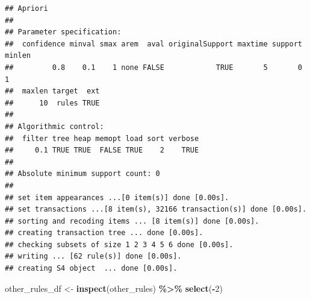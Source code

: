 \documentclass[
]{article}
\newenvironment{Shaded}{\begin{snugshade}}{\end{snugshade}}
\newcommand{\DecValTok}[1]{\textcolor[rgb]{0.00,0.00,0.81}{#1}}
\newcommand{\FunctionTok}[1]{\textcolor[rgb]{0.13,0.29,0.53}{\textbf{#1}}}
\newcommand{\NormalTok}[1]{#1}
\newcommand{\OtherTok}[1]{\textcolor[rgb]{0.56,0.35,0.01}{#1}}
\newcommand{\SpecialCharTok}[1]{\textcolor[rgb]{0.81,0.36,0.00}{\textbf{#1}}}
\begin{document}
\begin{verbatim}
## Apriori
## 
## Parameter specification:
##  confidence minval smax arem  aval originalSupport maxtime support minlen
##         0.8    0.1    1 none FALSE            TRUE       5       0      1
##  maxlen target  ext
##      10  rules TRUE
## 
## Algorithmic control:
##  filter tree heap memopt load sort verbose
##     0.1 TRUE TRUE  FALSE TRUE    2    TRUE
## 
## Absolute minimum support count: 0 
## 
## set item appearances ...[0 item(s)] done [0.00s].
## set transactions ...[8 item(s), 32166 transaction(s)] done [0.00s].
## sorting and recoding items ... [8 item(s)] done [0.00s].
## creating transaction tree ... done [0.00s].
## checking subsets of size 1 2 3 4 5 6 done [0.00s].
## writing ... [62 rule(s)] done [0.00s].
## creating S4 object  ... done [0.00s].
\end{verbatim}

\begin{Shaded}
\begin{Highlighting}[]
\NormalTok{other\_rules\_df }\OtherTok{\textless{}{-}} \FunctionTok{inspect}\NormalTok{(other\_rules) }\SpecialCharTok{\%\textgreater{}\%} \FunctionTok{select}\NormalTok{(}\SpecialCharTok{{-}}\DecValTok{2}\NormalTok{)}
\end{Highlighting}
\end{Shaded}
\end{document}
